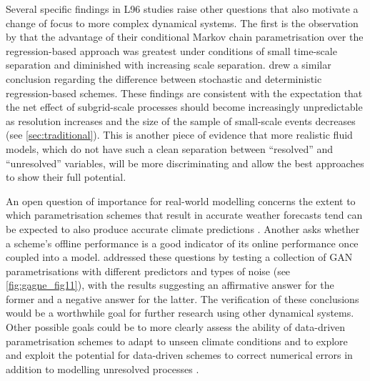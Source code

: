 \documentclass[../main.tex]{subfiles}
\begin{document}
Several specific findings in L96 studies raise other questions that also
motivate a change of focus to more complex dynamical systems. The first is the
observation by \textcite{crommelin2008} that the advantage of their conditional
Markov chain parametrisation over the regression-based approach was greatest
under conditions of small time-scale separation and diminished with increasing
scale separation. \textcite{arnold2013} drew a similar conclusion regarding the
difference between stochastic and deterministic regression-based schemes. These
findings are consistent with the expectation that the net effect of
subgrid-scale processes should become increasingly unpredictable as resolution
increases and the size of the sample of small-scale events decreases (see
\cref{sec:traditional}). This is another piece of evidence that more
realistic fluid models, which do not have such a clean separation between
``resolved'' and ``unresolved'' variables, will be more discriminating and
allow the best approaches to show their full potential.

An open question of importance for real-world modelling concerns the extent to
which parametrisation schemes that result in accurate weather forecasts tend
can be expected to also produce accurate climate predictions
\parencite{christensen2019}. Another asks whether a scheme's offline
performance is a good indicator of its online performance once coupled into a
model. \textcite{gagne2020} addressed these questions by testing a collection
of GAN parametrisations with different predictors and types of noise (see
\cref{fig:gagne_fig11}), with the results suggesting an affirmative answer for
the former and a negative answer for the latter. The verification of these
conclusions would be a worthwhile goal for further research using other
dynamical systems. Other possible goals could be to more clearly assess the
ability of data-driven parametrisation schemes to adapt to unseen climate
conditions \parencite{christensen2015} and to explore and exploit the potential
for data-driven schemes to correct numerical errors in addition to modelling
unresolved processes \parencite{bhouri2023}.
\end{document}
